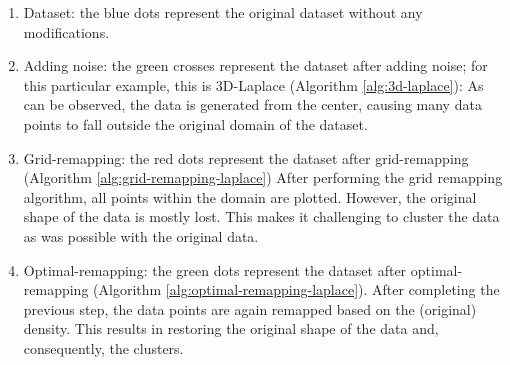 \begin{enumerate}
    \item Dataset: the blue dots represent the original dataset without any modifications.
    \item Adding noise: the green crosses represent the dataset after adding noise; for this particular example, this is 3D-Laplace (Algorithm \ref{alg:3d-laplace}):
          As can be observed, the data is generated from the center, causing many data points to fall outside the original domain of the dataset.
    \item Grid-remapping: the red dots represent the dataset after grid-remapping (Algorithm \ref{alg:grid-remapping-laplace})
          After performing the grid remapping algorithm, all points within the domain are plotted.
          However, the original shape of the data is mostly lost.
          This makes it challenging to cluster the data as was possible with the original data.
    \item Optimal-remapping: the green dots represent the dataset after optimal-remapping (Algorithm \ref{alg:optimal-remapping-laplace}).
          After completing the previous step, the data points are again remapped based on the (original) density.
          This results in restoring the original shape of the data and, consequently, the clusters.
\end{enumerate}
